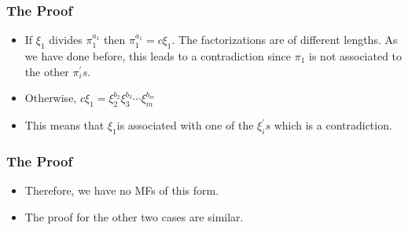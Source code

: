 \begin{frame}
  \frametitle{The Proof}
  \begin{itemize}
    \item If $\xi_{1}$ divides $\pi_{1}^{a_{1}}$ then $\pi_{1}^{a_{1}}=c\xi_{1}$.
      The factorizations are of different lengths.
      As we have done before, this leads to a contradiction since $\pi_{1}$ is not associated to the other $\pi_{i}^{'}s$. 
  \end{itemize}

  \pause{}
  \begin{itemize}
    \item Otherwise, $c\xi_{1}=\xi_{2}^{b_{2}}\xi_{3}^{b_{3}}\cdots\xi_{m}^{b_{m}}$
  \end{itemize}

  \pause{}
  \begin{itemize}
    \item This means that $\xi_{1}$is associated with one of the $\xi_{i}^{'}s$
      which is a contradiction.
  \end{itemize}
\end{frame}

\begin{frame}
  \frametitle{The Proof}
  \begin{itemize}
    \item Therefore, we have no MFs of this form.
  \end{itemize}

  \pause{}
  \begin{itemize}
    \item The proof for the other two cases are similar. 
  \end{itemize}
\end{frame}
